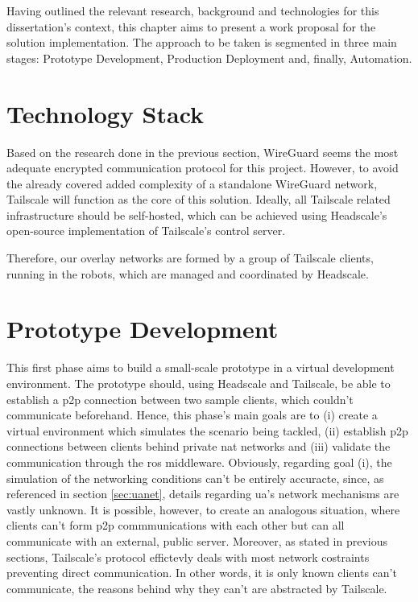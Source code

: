 \documentclass[11pt,twoside,a4paper]{report}
\begin{document}
Having outlined the relevant research, background and technologies for this dissertation's context, this chapter aims to present a work proposal for the solution implementation. The approach to be taken is segmented in three main stages: Prototype Development, Production Deployment and, finally, Automation.

\section{Technology Stack}

Based on the research done in the previous section, WireGuard seems the most adequate encrypted communication protocol for this project. However, to avoid the already covered added complexity of a standalone WireGuard network, Tailscale will function as the core of this solution. Ideally, all Tailscale related infrastructure should be self-hosted, which can be achieved using Headscale's open-source implementation of Tailscale's control server. 

Therefore, our overlay networks are formed by a group of Tailscale clients, running in the robots, which are managed and coordinated by Headscale.

\section{Prototype Development}
\label{sec:protodev}

This first phase aims to build a small-scale prototype in a virtual development environment. The prototype should, using Headscale and Tailscale, be able to establish a \ac{p2p} connection between two sample clients, which couldn't communicate beforehand. Hence, this phase's main goals are to (i) create a virtual environment which simulates the scenario being tackled, (ii) establish \ac{p2p} connections between clients behind private \ac{nat} networks  and (iii) validate the communication through the \ac{ros} middleware. Obviously, regarding goal (i), the simulation of the networking conditions can't be entirely accuracte, since, as referenced in section \ref{sec:uanet}, details regarding \ac{ua}'s network mechanisms are vastly unknown. It is possible, however, to create an analogous situation, where clients can't form \ac{p2p} commmunications with each other but can all communicate with an external, public server. Moreover, as stated in previous sections, Tailscale's protocol effictevly deals with most network costraints preventing direct communication. In other words, it is only known clients can't communicate, the reasons behind why they can't are abstracted by Tailscale.
\end{document}
